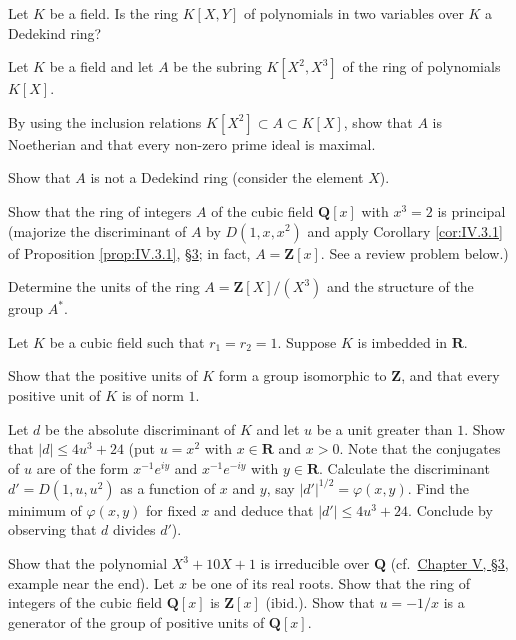  Let $K$ be a field. Is the ring $K[X,Y]$ of polynomials in two
variables over $K$ a Dedekind ring?

 Let $K$ be a field and let $A$ be the subring
$K[X^{2},X^{3}]$ of the ring of polynomials $K[X]$.
\begin{alist}
\item By using the inclusion relations
$K[X^{2}]\subset A\subset K[X]$, show that $A$ is Noetherian and that every
non-zero prime ideal is maximal.
\item Show that $A$ is not a Dedekind ring (consider the element $X$).
\end{alist}



 Show that the ring of integers $A$ of the cubic field
$\mathbf{Q}[x]$ with $x^{3}=2$ is principal (majorize the discriminant of
$A$ by $D(1,x,x^{2})$ and apply Corollary \ref{cor:IV.3.1} of Proposition
\ref{prop:IV.3.1}, \hyperref[sec:4.3]{§3}; in fact, $A=\mathbf{Z}[x]$. See a review problem below.)

 Determine the units of the ring $A=\mathbf{Z}[X]/(X^{3})$ and the
structure of the group $A^{*}$.

 Let $K$ be a cubic field such that $r_{1}=r_{2}=1$. Suppose $K$
is imbedded in $\mathbf{R}$.
\begin{alist}
\item Show that the positive units of $K$ form a group isomorphic to
$\mathbf{Z}$, and that every positive unit of $K$ is of norm $1$.
\item Let $d$ be the absolute discriminant of $K$ and let $u$ be a unit
greater than $1$. Show that $|d|\leq4u^{3}+24$ (put $u=x^{2}$ with
$x\in\mathbf{R}$ and $x>0$. Note that the conjugates of $u$ are of the form
$x^{-1}e^{iy}$ and $x^{-1}e^{-iy}$ with $y\in\mathbf{R}$. Calculate the
discriminant $d'=D(1,u,u^{2})$ as a function of $x$ and $y$, say
$|d'|^{1/2}=\varphi(x,y)$. Find the minimum of $\varphi(x,y)$ for fixed $x$
and deduce that $|d'|\leq4u^{3}+24$. Conclude by observing that $d$ divides
$d'$).
\item Show that the polynomial $X^{3}+10X+1$ is irreducible over
$\mathbf{Q}$ (cf.\ \hyperref[sec:5.3]{Chapter V, §3}, example near the end). Let $x$ be one of
its real roots. Show that the ring of integers of the cubic field
$\mathbf{Q}[x]$ is $\mathbf{Z}[x]$ (ibid.). Show that $u=-1/x$ is a
generator of the group of positive units of $\mathbf{Q}[x]$.
\end{alist}

